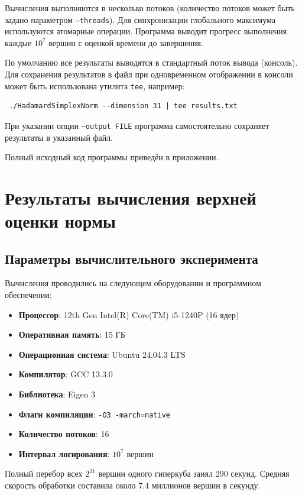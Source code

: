 \documentclass[main]{subfiles}
\begin{document}
Вычисления выполняются в несколько потоков (количество потоков может быть задано параметром \texttt{--threads}). Для синхронизации глобального максимума используются атомарные операции. Программа выводит прогресс выполнения каждые $10^7$ вершин с оценкой времени до завершения.

По умолчанию все результаты выводятся в стандартный поток вывода (консоль). Для сохранения результатов в файл при одновременном отображении в консоли может быть использована утилита \texttt{tee}, например:
\begin{verbatim}
 ./HadamardSimplexNorm --dimension 31 | tee results.txt
\end{verbatim}
При указании опции \texttt{--output FILE} программа самостоятельно сохраняет результаты в указанный файл.

Полный исходный код программы приведён в приложении.
\section{Результаты вычисления верхней оценки нормы}

\subsection{Параметры вычислительного эксперимента}

Вычисления проводились на следующем оборудовании и программном обеспечении:

\begin{itemize}
    \item \textbf{Процессор}: 12th Gen Intel(R) Core(TM) i5-1240P (16 ядер)
    \item \textbf{Оперативная память}: 15 ГБ
    \item \textbf{Операционная система}: Ubuntu 24.04.3 LTS
    \item \textbf{Компилятор}: GCC 13.3.0
    \item \textbf{Библиотека}: Eigen 3
    \item \textbf{Флаги компиляции}: \texttt{-O3 -march=native}
    \item \textbf{Количество потоков}: 16
    \item \textbf{Интервал логирования}: $10^7$ вершин
\end{itemize}

Полный перебор всех $2^{31}$ вершин одного гиперкуба занял 290 секунд. Средняя скорость обработки составила около 7.4 миллионов вершин в секунду.
\end{document}
